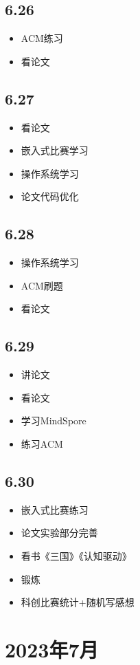 \documentclass[UTF8]{ctexart}
\begin{document}
\subsection*{6.26}
\begin{itemize}
    \item ACM练习
    \item 看论文
\end{itemize}
\subsection*{6.27}
\begin{itemize}
    \item 看论文
    \item 嵌入式比赛学习
    \item 操作系统学习
    \item 论文代码优化
\end{itemize}
\subsection*{6.28}
\begin{itemize}
    \item 操作系统学习
    \item ACM刷题
    \item 看论文
\end{itemize}
\subsection*{6.29}
\begin{itemize}
    \item 讲论文
    \item 看论文
    \item 学习MindSpore
    \item 练习ACM
\end{itemize}
\subsection*{6.30}
\begin{itemize}
    \item 嵌入式比赛练习
    \item 论文实验部分完善
    \item 看书《三国》《认知驱动》
    \item 锻炼
    \item 科创比赛统计+随机写感想
\end{itemize}
\section*{2023年7月}
\end{document}
